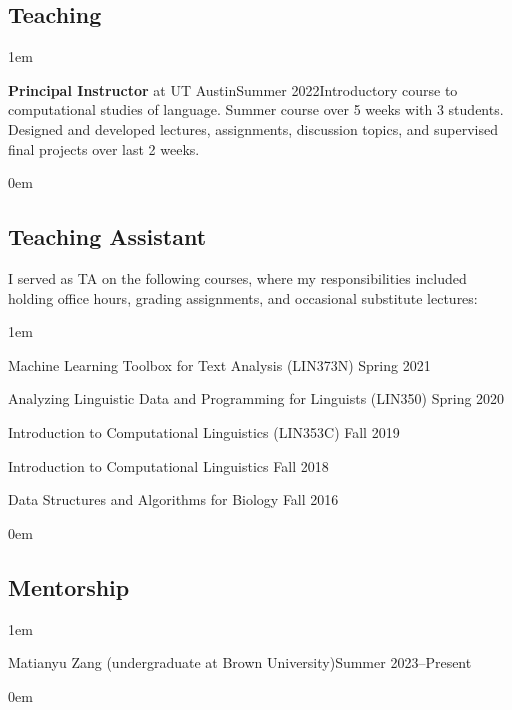 \subsection{Teaching}
\vspace{-0.5\baselineskip}
\leftskip1em\relax

  {\textbf{Principal Instructor} at UT Austin}{Summer 2022}{}{Introductory course to computational studies of language. Summer course over 5 weeks with 3 students. Designed and developed lectures, assignments, discussion topics, and supervised final projects over last 2 weeks.}

\leftskip0em\relax
  
\subsection{Teaching Assistant}

\quad I served as TA on the following courses, where my responsibilities included holding office hours, grading assignments, and occasional substitute lectures:

\leftskip1em\relax

\vspace{0.5\baselineskip}

\textbullet\enspace Machine Learning Toolbox for Text Analysis ({\rmsc LIN373N}) \hfill Spring 2021

\textbullet\enspace Analyzing Linguistic Data and Programming for Linguists ({\rmsc LIN350}) \hfill Spring 2020

\textbullet\enspace Introduction to Computational Linguistics ({\rmsc LIN353C}) \hfill Fall 2019

\textbullet\enspace Introduction to Computational Linguistics \hfill Fall 2018

\textbullet\enspace Data Structures and Algorithms for Biology \hfill Fall 2016

\leftskip0em\relax

\subsection{Mentorship}
\vspace{-0.5\baselineskip}
\leftskip1em\relax

  {Matianyu Zang (undergraduate at Brown University)}{Summer 2023--Present}{}{}

\leftskip0em\relax
